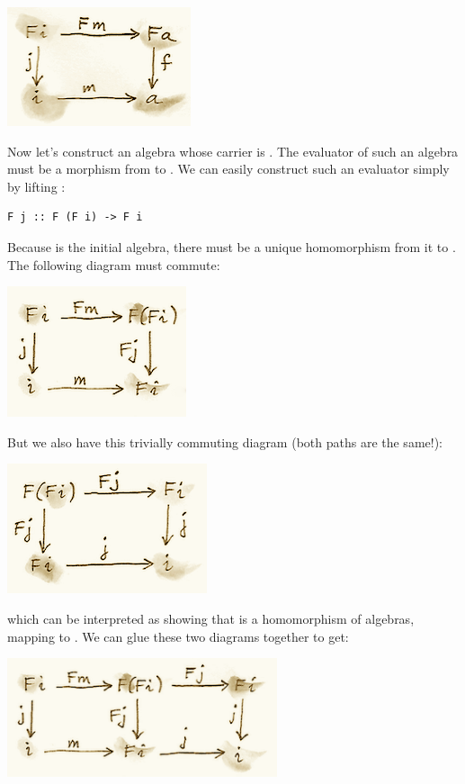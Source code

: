 \includegraphics{images/alg2.png}

Now let's construct an algebra whose carrier is . The
evaluator of such an algebra must be a morphism from 
to . We can easily construct such an evaluator simply by
lifting :

\begin{verbatim}
F j :: F (F i) -> F i
\end{verbatim}

Because  is the initial algebra, there must be a unique
homomorphism  from it to . The following
diagram must commute:

\includegraphics{images/alg3a.png}

But we also have this trivially commuting diagram (both paths are the
same!):

\includegraphics{images/alg3.png}

which can be interpreted as showing that  is a homomorphism of
algebras, mapping  to . We can
glue these two diagrams together to get:

\includegraphics[width=3.12500in]{images/alg4.png}

